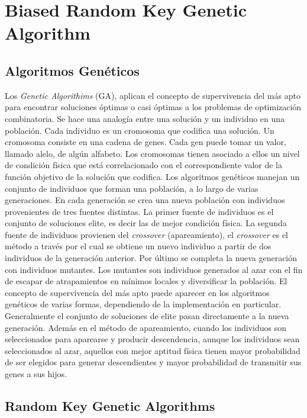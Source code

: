 
\chapter{Biased Random Key Genetic Algorithm}

\section{Algoritmos Genéticos}

Los \textit{Genetic Algorithims} (GA), \cite{Goldberg} aplican el concepto de supervivencia del más apto para encontrar soluciones óptimas o casi óptimas a los problemas de optimización combinatoria. Se hace una analogía entre una solución y un individuo en una población. Cada individuo es un cromosoma que codifica una solución. Un cromosoma consiste en una cadena de genes. Cada gen puede tomar un valor, llamado alelo, de algún alfabeto. Los cromosomas tienen asociado a ellos un nivel de condición física que está correlacionado con el correspondiente valor de la función objetivo de la solución que codifica. Los algoritmos genéticos manejan un conjunto de individuos que forman una población, a lo largo de varias generaciones. En cada generación se crea una nueva población con individuos provenientes de tres fuentes distintas. La primer fuente de individuos es el conjunto de soluciones elite, es decir las de mejor condición física. La segunda fuente de individuos provienen del \textit{crossover} (apareamiento), el \textit{crossover} es el método a través por el cual se obtiene un nuevo individuo a partir de dos individuos de la generación anterior. Por último se completa la nueva generación con individuos mutantes. Los mutantes son individuos generados al azar con el fin de escapar de atrapamientos en mínimos locales y diversificar la población. El concepto de supervivencia del más apto puede aparecer en los algoritmos genéticos de varias formas, dependiendo de la implementación en particular. Generalmente el conjunto de soluciones de elite pasan directamente a la nueva generación. Además en el método de apareamiento, cuando los individuos son seleccionados para aparearse y producir descendencia, aunque los individuos sean seleccionados al azar, aquellos con mejor aptitud física tienen mayor probabilidad de ser elegidos para generar descendientes y mayor probabilidad de transmitir sus genes a sus hijos.

\section{Random Key Genetic Algorithms}

